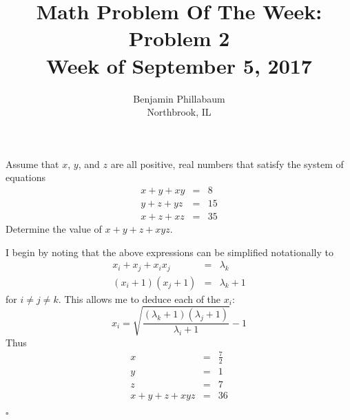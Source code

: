 \documentclass[11pt]{article}
\title{Math Problem Of The Week: Problem 2\\Week of September 5, 2017}
\author{Benjamin Phillabaum\\Northbrook, IL}
\begin{document}
\maketitle
\newpage

\begin{framed}
Assume that $x$, $y$, and $z$ are all positive, real numbers that satisfy the system of equations
\begin{eqnarray*}
x+y+xy&=&8\\
y+z+yz&=&15\\
x+z+xz&=&35
\end{eqnarray*}
Determine the value of $x+y+z+xyz$.
\end{framed}
I begin by noting that the above expressions can be simplified notationally to 
\begin{eqnarray*}
x_i + x_j +x_i x_j &=& \lambda_k\\
(x_i+1) (x_j+1) &=& \lambda_k+1
\end{eqnarray*}
for $i\neq j \neq k$. This allows me to deduce each of the $x_i$:
\begin{equation*}
x_i = \sqrt{\frac{(\lambda_k+1)(\lambda_j+1)}{\lambda_i + 1}}-1
\end{equation*}
Thus
\begin{eqnarray*}
x &=& \frac{7}{2}\\
y &=&1\\
z&=&7 \\
x+y+z+xyz &=& 36
\end{eqnarray*}

$\square$
\end{document}
